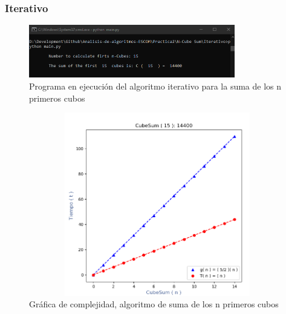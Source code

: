 \documentclass[12pt,twoside]{article}
\begin{document}
\subsubsection{Iterativo}
\begin{figure}[ht]
    \centering
    \includegraphics[width = 9cm]{cubico_iterativo_consola.png}
    \caption{Programa en ejecuci\'on del algoritmo iterativo para la suma de los n primeros cubos}
    \label{fig:n_cubos}
\end{figure}
\begin{figure}[ht]
    \centering
    \includegraphics[width = 13cm,height = 8cm ]{cubico_iterativo_grafica.png}
    \caption{Gr\'afica de complejidad, algoritmo de suma de los n primeros cubos}
    \label{fig:n_cubos_graf}
\end{figure}
\end{document}
